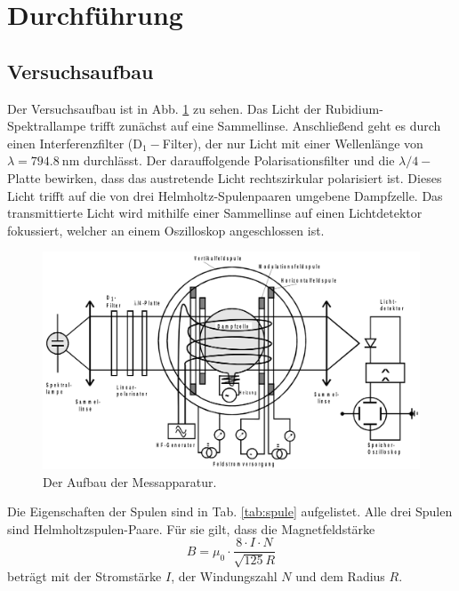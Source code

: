 \section{Durchführung}
\label{sec:Durchführung}

\subsection{Versuchsaufbau}
Der Versuchsaufbau ist in Abb. \ref{fig:aufbau} zu sehen.
Das Licht der Rubidium-Spektrallampe trifft zunächst auf eine Sammellinse. Anschließend geht es durch einen Interferenzfilter (D$_1-$Filter), der nur Licht mit einer Wellenlänge von $\lambda = \SI{794.8}{\nano\meter}$ durchlässt. Der darauffolgende Polarisationsfilter und die $\lambda / 4-$Platte bewirken, dass das austretende Licht rechtszirkular polarisiert ist. Dieses Licht trifft auf die von drei Helmholtz-Spulenpaaren umgebene Dampfzelle. Das transmittierte Licht wird mithilfe einer Sammellinse auf einen Lichtdetektor fokussiert, welcher an einem Oszilloskop angeschlossen ist. \cite{V21}

\begin{figure}
    \centering
    \includegraphics[width=15cm]{fotos/aufbau.png}
    \caption{Der Aufbau der Messapparatur. \cite{V21}}
    \label{fig:aufbau}
\end{figure}

Die Eigenschaften der Spulen sind in Tab. \ref{tab:spule} aufgelistet. 
Alle drei Spulen sind Helmholtzspulen-Paare. Für sie gilt, dass die Magnetfeldstärke 
\begin{equation}
    B = \mu_0 \cdot \frac{8 \cdot I \cdot N}{\sqrt{125} R}
    \label{eq:B}
\end{equation}
beträgt mit der Stromstärke $I$, der Windungszahl $N$ und dem Radius $R$. 

